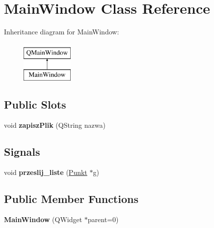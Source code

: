\hypertarget{class_main_window}{}\section{Main\+Window Class Reference}
\label{class_main_window}
Inheritance diagram for Main\+Window\+:\begin{figure}[H]
\begin{center}
\leavevmode
\includegraphics[height=2.000000cm]{class_main_window}
\end{center}
\end{figure}
\subsection*{Public Slots}
\begin{DoxyCompactItemize}
\item 
\mbox{\label{class_main_window_af3c0acb6430798883d9df9dadea3b725}} 
void {\bfseries zapisz\+Plik} (Q\+String nazwa)
\end{DoxyCompactItemize}
\subsection*{Signals}
\begin{DoxyCompactItemize}
\item 
\mbox{\label{class_main_window_ae47c4ed1673da6c67f1bf071109f2fbd}} 
void {\bfseries przeslij\+\_\+liste} (\mbox{\hyperlink{struct_punkt}{Punkt}} $\ast$g)
\end{DoxyCompactItemize}
\subsection*{Public Member Functions}
\begin{DoxyCompactItemize}
\item 
\mbox{\label{class_main_window_a8b244be8b7b7db1b08de2a2acb9409db}} 
{\bfseries Main\+Window} (Q\+Widget $\ast$parent=0)
\end{DoxyCompactItemize}

